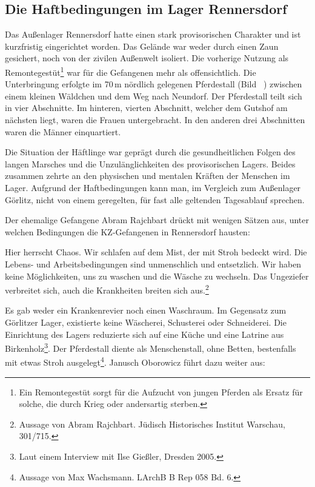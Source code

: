 \subsection{Die Haftbedingungen im Lager Rennersdorf}
Das Außenlager Rennersdorf hatte einen stark provisorischen Charakter und ist kurzfristig eingerichtet worden. Das Gelände war weder durch
einen Zaun gesichert, noch von der zivilen Außenwelt isoliert. Die vorherige Nutzung als Remontegestüt\footnote{Ein Remontegestüt sorgt für die Aufzucht von jungen Pferden als Ersatz für solche, die durch Krieg oder andersartig sterben.} war für die Gefangenen mehr als offensichtlich. Die Unterbringung erfolgte im 70\,m nördlich gelegenen Pferdestall (Bild ~) zwischen einem kleinen Wäldchen und dem Weg nach Neundorf.
Der Pferdestall teilt sich in vier Abschnitte. Im hinteren, vierten Abschnitt, welcher dem Gutshof am nächsten liegt, waren die Frauen untergebracht. In den anderen drei Abschnitten waren die Männer einquartiert.


Die Situation der Häftlinge war geprägt durch die gesundheitlichen Folgen des langen Marsches und die Unzulänglichkeiten des provisorischen Lagers. Beides zusammen zehrte an den physischen und mentalen Kräften der Menschen im Lager. Aufgrund der Haftbedingungen kann man, im Vergleich zum Außenlager Görlitz, nicht von einem geregelten, für fast alle geltenden Tagesablauf sprechen. 

Der ehemalige Gefangene Abram Rajchbart drückt mit wenigen Sätzen aus, unter welchen Bedingungen die KZ-Gefangenen in Rennersdorf hausten:

\begin{leftbar} 
Hier herrscht Chaos. Wir schlafen auf dem Mist, der mit Stroh bedeckt wird. Die Lebens- und Arbeitsbedingungen sind unmenschlich und entsetzlich. Wir haben keine Möglichkeiten, uns zu waschen und die Wäsche zu wechseln. Das Ungeziefer verbreitet sich, auch die Krankheiten breiten sich aus.\footnote{Aussage von Abram Rajchbart. Jüdisch Historisches Institut Warschau, 301/715.}
\end{leftbar}

Es gab weder ein Krankenrevier noch einen Waschraum. Im Gegensatz zum Görlitzer Lager, existierte keine Wäscherei, Schusterei oder Schneiderei. Die Einrichtung des Lagers reduzierte sich auf eine Küche und eine Latrine aus Birkenholz\footnote{Laut einem Interview  mit Ilse Gießler, Dresden 2005.}. Der Pferdestall diente als \glqq Menschenstall\grqq, ohne Betten, bestenfalls mit etwas Stroh ausgelegt\footnote{Aussage von Max Wachsmann. LArchB B Rep 058 Bd. 6.}. Janusch Oborowicz führt dazu weiter aus:


